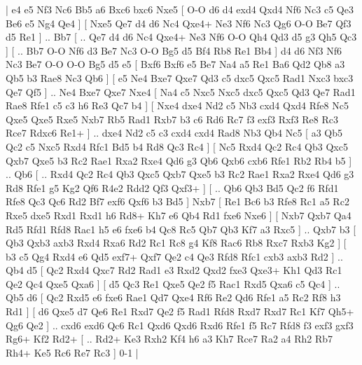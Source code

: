 \makegametitle 
|   e4   e5    Nf3   Nc6    Bb5   a6    Bxc6   bxc6    Nxe5 [  O-O d6  d4 exd4  Qxd4 Nf6  Nc3 c5  Qe3 Be6  e5 Ng4  Qe4   ]  [  Nxe5 Qe7  d4 d6  Nc4 Qxe4+  Ne3 Nf6  Nc3 Qg6  O-O Be7  Qf3 d5  Re1   ] .. Bb7 [ .. Qe7  d4 d6  Nc4 Qxe4+  Ne3 Nf6  O-O Qh4  Qd3 d5  g3 Qh5  Qc3   ]  [ .. Bb7  O-O Nf6  d3 Be7  Nc3 O-O  Bg5 d5  Bf4 Rb8  Re1 Bb4   ]  d4   d6    Nf3   Nf6    Nc3   Be7    O-O   O-O    Bg5   d5    e5 [  Bxf6 Bxf6  e5 Be7  Na4 a5  Re1 Ba6  Qd2 Qb8  a3 Qb5  b3 Rae8  Nc3 Qb6   ]  [  e5 Ne4  Bxe7 Qxe7  Qd3 c5  dxc5 Qxc5  Rad1 Nxc3  bxc3 Qe7  Qf5   ] .. Ne4    Bxe7   Qxe7    Nxe4 [  Na4 c5  Nxc5 Nxc5  dxc5 Qxc5  Qd3 Qe7  Rad1 Rae8  Rfe1 c5  c3 h6  Re3 Qc7  b4   ]  [  Nxe4 dxe4  Nd2 c5  Nb3 cxd4  Qxd4 Rfe8  Nc5 Qxe5  Qxe5 Rxe5  Nxb7 Rb5  Rad1 Rxb7  b3 c6  Rd6 Rc7  f3 exf3  Rxf3 Re8  Rc3 Rce7  Rdxc6 Re1+   ] .. dxe4    Nd2   c5    c3   cxd4    cxd4   Rad8    Nb3   Qb4    Nc5 [  a3 Qb5  Qc2 c5  Nxc5 Rxd4  Rfc1 Bd5  b4 Rd8  Qc3 Rc4   ]  [  Nc5 Rxd4  Qc2 Rc4  Qb3 Qxc5  Qxb7 Qxe5  b3 Rc2  Rae1 Rxa2  Rxe4 Qd6  g3 Qb6  Qxb6 cxb6  Rfe1 Rb2  Rb4 b5   ] .. Qb6 [ .. Rxd4  Qc2 Rc4  Qb3 Qxc5  Qxb7 Qxe5  b3 Rc2  Rae1 Rxa2  Rxe4 Qd6  g3 Rd8  Rfe1 g5  Kg2 Qf6  R4e2 Rdd2  Qf3 Qxf3+   ]  [ .. Qb6  Qb3 Bd5  Qc2 f6  Rfd1 Rfe8  Qc3 Qc6  Rd2 Bf7  exf6 Qxf6  b3 Bd5   ]  Nxb7 [  Re1 Bc6  b3 Rfe8  Rc1 a5  Rc2 Rxe5  dxe5 Rxd1  Rxd1 h6  Rd8+ Kh7  e6 Qb4  Rd1 fxe6  Nxe6   ]  [  Nxb7 Qxb7  Qa4 Rd5  Rfd1 Rfd8  Rac1 h5  e6 fxe6  b4 Qc8  Rc5 Qb7  Qb3 Kf7  a3 Rxc5   ] .. Qxb7    b3 [  Qb3 Qxb3  axb3 Rxd4  Rxa6 Rd2  Rc1 Rc8  g4 Kf8  Rac6 Rb8  Rxc7 Rxb3  Kg2   ]  [  b3 c5  Qg4 Rxd4  e6 Qd5  exf7+ Qxf7  Qe2 c4  Qe3 Rfd8  Rfc1 cxb3  axb3 Rd2   ] .. Qb4    d5 [  Qc2 Rxd4  Qxc7 Rd2  Rad1 e3  Rxd2 Qxd2  fxe3 Qxe3+  Kh1 Qd3  Rc1 Qe2  Qc4 Qxe5  Qxa6   ]  [  d5 Qc3  Re1 Qxe5  Qe2 f5  Rac1 Rxd5  Qxa6 c5  Qc4   ] .. Qb5    d6 [  Qc2 Rxd5  e6 fxe6  Rae1 Qd7  Qxe4 Rf6  Re2 Qd6  Rfe1 a5  Rc2 Rf8  h3 Rd1   ]  [  d6 Qxe5  d7 Qe6  Re1 Rxd7  Qe2 f5  Rad1 Rfd8  Rxd7 Rxd7  Rc1 Kf7  Qh5+ Qg6  Qe2   ] .. cxd6    exd6   Qc6    Rc1   Qxd6    Qxd6   Rxd6    Rfe1   f5    Rc7   Rfd8    f3   exf3    gxf3   Rg6+    Kf2   Rd2+    [ .. Rd2+  Ke3 Rxh2  Kf4 h6  a3 Kh7  Rce7 Ra2  a4 Rh2  Rb7 Rh4+  Ke5 Rc6  Re7 Rc3   ] 0-1  |
